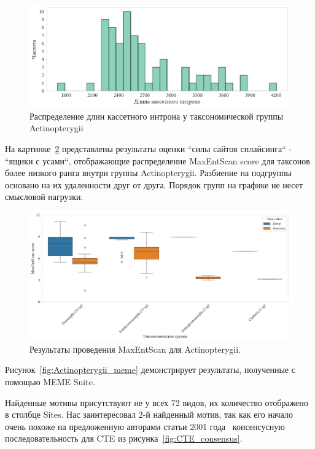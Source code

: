 \begin{figure}[h] %
    \centering
    \includegraphics[width=1.0\textwidth]{images/Actinopterygii_intron}
    \caption{Распределение длин кассетного интрона у таксономической группы Actinopterygii}
    \label{fig:Actinopterygii_intron}
\end{figure}


На картинке~\ref{fig:Actinopterygii_maxentscan} представлены результаты оценки ``силы сайтов сплайсинга`` - ``ящики с усами``, отображающие распределение MaxEntScan score для таксонов более низкого ранга внутри группы Actinopterygii.
Разбиение на подгруппы основано на их удаленности друг от друга.
Порядок групп на графике не несет смысловой нагрузки.

\begin{figure}[h] %
    \centering
    \includegraphics[width=1.0\textwidth]{images/Actinopterygii_maxentscan}
    \caption{Результаты проведения MaxEntScan для Actinopterygii.}
    \label{fig:Actinopterygii_maxentscan}
\end{figure}


Рисунок~\ref{fig:Actinopterygii_meme} демонстрирует результаты, полученные с помощью MEME Suite.

Найденные мотивы присутствуют не у всех 72 видов, их количество отображено в столбце Sites.
Нас заинтересовал 2-й найденный мотив, так как его начало очень похоже на предложенную авторами статьи 2001 года~\cite{cte_consensus} консенсусную последовательность для CTE из рисунка~\ref{fig:CTE_consensus}.

